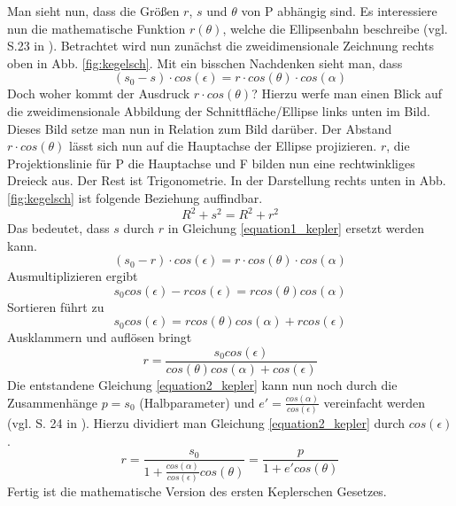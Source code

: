 \newpar
Man sieht nun, dass die Größen \ensuremath{r}, \ensuremath{s} und \ensuremath{\theta} von P abhängig sind. Es interessiere nun die mathematische Funktion \ensuremath{r(\theta)}, welche die Ellipsenbahn beschreibe (vgl. S.23 in \cite{Raumflugm}). Betrachtet wird nun zunächst die zweidimensionale Zeichnung rechts oben in Abb. \ref{fig:kegelsch}. Mit ein bisschen Nachdenken sieht man, dass
\begin{equation}
	(s_0-s) \cdot cos(\epsilon) = r \cdot cos (\theta) \cdot cos(\alpha)
	\label{equation1_kepler}
\end{equation} 
Doch woher kommt der Ausdruck \ensuremath{r \cdot cos(\theta)}? Hierzu werfe man einen Blick auf die zweidimensionale Abbildung der Schnittfläche/Ellipse links unten im Bild. Dieses Bild setze man nun in Relation zum Bild darüber. Der Abstand \ensuremath{r \cdot cos(\theta)} lässt sich nun auf die Hauptachse der Ellipse projizieren. \ensuremath{r}, die Projektionslinie für P die Hauptachse und F bilden nun eine rechtwinkliges Dreieck aus. Der Rest ist Trigonometrie. 
\newpar
In der Darstellung rechts unten in Abb. \ref{fig:kegelsch} ist folgende Beziehung auffindbar. 
\begin{equation}
 R^2 + s^2 = R^2 + r^2
\end{equation} 
Das bedeutet, dass \ensuremath{s} durch \ensuremath{r} in Gleichung \ref{equation1_kepler} ersetzt werden kann. 
\begin{equation}
	(s_0-r) \cdot cos(\epsilon) = r \cdot cos (\theta) \cdot cos(\alpha)
\end{equation}
Ausmultiplizieren ergibt
\begin{equation}
s_0 cos(\epsilon) - r cos(\epsilon) = r cos (\theta) cos(\alpha)
\end{equation}
Sortieren führt zu 
\begin{equation}
s_0 cos(\epsilon) = r cos (\theta) cos(\alpha) + r cos(\epsilon)
\end{equation}
Ausklammern und auflösen bringt
\begin{equation}
	r = \frac{s_0 cos(\epsilon) }{cos (\theta) cos(\alpha) + cos(\epsilon)}
		\label{equation2_kepler}
\end{equation}
Die entstandene Gleichung \ref{equation2_kepler} kann nun noch durch die Zusammenhänge \ensuremath{p=s_0} (Halbparameter) und \ensuremath{e'=\frac{cos(\alpha)}{cos(\epsilon)}} vereinfacht werden (vgl. S. 24 in \cite{Raumflugm}). Hierzu dividiert man Gleichung \ref{equation2_kepler} durch \ensuremath{cos(\epsilon)}. 
\begin{equation}
r = \frac{s_0}{1+\frac{cos(\alpha)}{cos(\epsilon)}cos (\theta)} = \frac{p}{1 + e' cos(\theta)} 
\label{equation3_kepler}
\end{equation}
Fertig ist die mathematische Version des ersten Keplerschen Gesetzes. 


